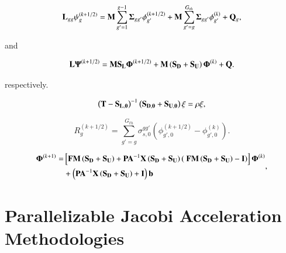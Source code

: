 \documentclass[preprint,10pt]{elsarticle}
\begin{document}
\begin{equation}
\label{eq::DSA_MTG_trans_it_eq}
{\bf L}_{gg} \psi_g^{(k+1/2)} = {\bf M} \sum_{g'=1}^{g-1} {\bf \Sigma}_{g g'} \phi_{g'}^{(k+1/2)} + {\bf M} \sum_{g'=g}^{G_{th}} {\bf \Sigma}_{g g'} \phi_{g'}^{(k)} + {\bf Q}_g, 
\end{equation}

\noindent and 

\begin{equation}
\label{eq::DSA_MTG_trans_it_eq_ops}
{\bf L} {\bf \Psi}^{(k+1/2)} = {\bf M} {\bf S_L} {\bf \Phi}^{(k+1/2)} + {\bf M}\left(  {\bf S_D} + {\bf S_U} \right)  {\bf \Phi}^{(k)} + {\bf Q} .
\end{equation}

\noindent respectively.


\begin{equation}
\label{eq::DSA_MTG_eigenpprob}
\left(  {\bf T} - {\bf S_{L,0}}  \right)^{-1} \left( {\bf S_{D,0}}+ {\bf S_{U,0}} \right)\xi = \rho \xi ,
\end{equation}


\begin{equation}
\label{eq::DSA_MTG_diff_residual}
R_g^{(k+1/2)} = \sum_{g'=g}^{G_{th}} \sigma_{s,0}^{g g'} \left( \phi_{g',0}^{(k+1/2)} - \phi_{g',0}^{(k)} \right) .
\end{equation}

\begin{equation}
\label{eq::DSA_MTG_GS_op_update_simple}
\begin{aligned}
 {\bf \Phi}^{(k+1)} = &\left[ {\bf F}  {\bf M} \left( {\bf S_{D}} + {\bf S_{U}} \right) +  {\bf P} {\bf A}^{-1}  {\bf X} \left( {\bf S_{D}} + {\bf S_{U}} \right) \left(  \ {\bf F}  {\bf M} \left( {\bf S_{D}} + {\bf S_{U}} \right)  -  {\bf I} \right) \right] {\bf \Phi}^{(k)} \\
&+ \left(  {\bf P} {\bf A}^{-1}  {\bf X} \left( {\bf S_{D}} + {\bf S_{U}} \right)  + {\bf I} \right) {\bf b}
\end{aligned} ,
\end{equation}

\section{Parallelizable Jacobi Acceleration Methodologies} \label{sec::Jac}
\end{document}
